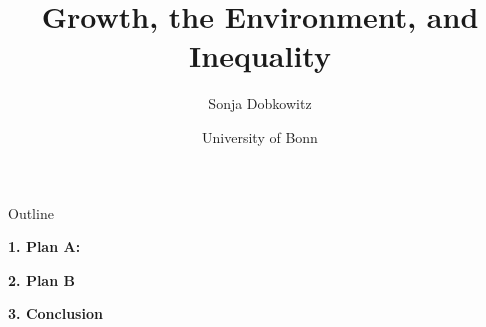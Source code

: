 \documentclass[11pt,aspectratio=169]{beamer}
\author[Sonja Dobkowitz]{\small Sonja Dobkowitz}
\title{Growth, the Environment, and Inequality}
\date{\footnotesize{University of Bonn}}
\institute{December 14, 2021}
\begin{document}
	
	{
		\begin{frame}
		\titlepage
	\end{frame}
}



\begin{frame}{Outline}

\begin{minipage}{0.32\textwidth} 
	\textbf{1. Plan A:}
\hspace{2mm}
\vspace{26mm}
\end{minipage} 
\begin{minipage}{0.32\textwidth} 
	\tableofcontents
\end{minipage}

\textbf{2. Plan B}

\textbf{3. Conclusion}

\end{frame}
\end{document}
